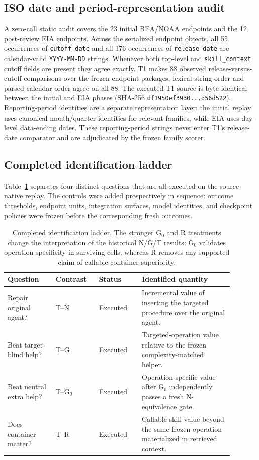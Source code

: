 \subsection{ISO date and period-representation audit}
A zero-call static audit covers the 23 initial BEA/NOAA endpoints and the 12 post-review EIA endpoints. Across the serialized endpoint objects, all 55 occurrences of \texttt{cutoff\_date} and all 176 occurrences of \texttt{release\_date} are calendar-valid \texttt{YYYY-MM-DD} strings. Whenever both top-level and \texttt{skill\_context} cutoff fields are present they agree exactly. T1 makes 88 observed release-versus-cutoff comparisons over the frozen endpoint packages; lexical string order and parsed-calendar order agree on all 88. The executed T1 source is byte-identical between the initial and EIA phases (SHA-256 \texttt{df1950ef3930...d56d522}). Reporting-period identities are a separate representation layer: the initial replay uses canonical month/quarter identities for relevant families, while EIA uses day-level data-ending dates. These reporting-period strings never enter T1's release-date comparator and are adjudicated by the frozen family scorer.

\subsection{Completed identification ladder}
Table~\ref{tab:identification} separates four distinct questions that are all executed on the source-native replay. The controls were added prospectively in sequence: outcome thresholds, endpoint units, integration surfaces, model identities, and checkpoint policies were frozen before the corresponding fresh outcomes.

\begin{table}[ht]
\centering
\scriptsize
\setlength{\tabcolsep}{3.0pt}
\begin{tabular}{p{0.19\linewidth}p{0.17\linewidth}p{0.17\linewidth}p{0.36\linewidth}}
\toprule
Question & Contrast & Status & Identified quantity \\
\midrule
Repair original agent? & T--N & Executed & Incremental value of inserting the targeted procedure over the original agent. \\
Beat target-blind help? & T--G & Executed & Targeted-operation value relative to the frozen complexity-matched helper. \\
Beat neutral extra help? & T--G$_0$ & Executed & Operation-specific value after G$_0$ independently passes a fresh N-equivalence gate. \\
Does container matter? & T--R & Executed & Callable-skill value beyond the same frozen operation materialized in retrieved context. \\
\bottomrule
\end{tabular}
\caption{Completed identification ladder. The stronger G$_0$ and R treatments change the interpretation of the historical N/G/T results: G$_0$ validates operation specificity in surviving cells, whereas R removes any supported claim of callable-container superiority.}
\label{tab:identification}
\end{table}

